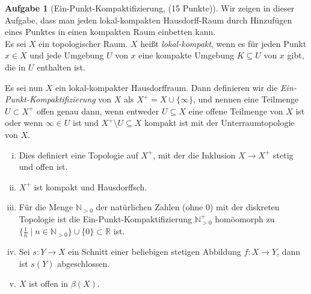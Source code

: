 \documentclass{article}
\theoremstyle{definition}
\newtheorem{aufgabe}{Aufgabe}
\theoremstyle{remark}
\begin{document}
\begin{aufgabe}[Ein-Punkt-Kompaktifizierung, (15 Punkte)]
Wir zeigen in dieser Aufgabe, dass man jeden lokal-kompakten Hausdorff-Raum durch Hinzufügen eines Punktes in einen kompakten Raum einbetten kann.\\
Es sei $X$ ein topologischer Raum. $X$ heißt {\itshape lokal-kompakt}, wenn es für jeden Punkt $x\in X$ und jede Umgebung $U$ von $x$ eine kompakte Umgebung $K\subseteq U$ von $x$ gibt, die in $U$ enthalten ist.

Es sei nun $X$ ein lokal-kompakter Hausdorffraum. Dann definieren wir die {\itshape Ein-Punkt-Kompaktifizierung} von $X$ als $X^+= X\cup\{\infty\}$, und nennen eine Teilmenge $U\subset X^+$ offen genau dann, wenn entweder $U\subseteq X$ eine offene Teilmenge von $X$ ist oder wenn $\infty\in U$ ist und $X^+\setminus U\subseteq X$ kompakt ist mit der Unterraumtopologie von $X$.
\begin{enumerate}[i)]
	\item Dies definiert eine Topologie auf $X^+$, mit der die Inklusion $X\to X^+$ stetig und offen ist.
	\item $X^+$ ist kompakt und Hausdorffsch.
	\item Für die Menge $\mathbb N_{>0}$ der natürlichen Zahlen (ohne 0) mit der diskreten Topologie ist die Ein-Punkt-Kompaktifizierung $\mathbb N_{>0}^+$ homöomorph zu $\{\frac{1}{n}\mid n\in \mathbb N_{>0} \} \cup \{0\} \subset \mathbb R$ ist.
	\item Sei $s\colon Y\to X$ ein Schnitt einer beliebigen stetigen Abbildung $f\colon X\to Y$, dann ist $s(Y)$ abgeschlossen. 
	\item $X$ ist offen in $\beta(X)$.
\end{enumerate}
\end{aufgabe}
\end{document}
